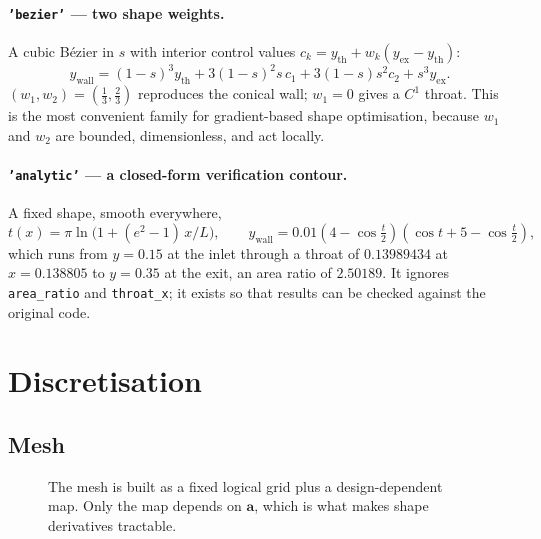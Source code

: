 \documentclass[11pt,a4paper]{article}
\newcommand{\vect}[1]{\boldsymbol{#1}}
\newcommand{\avec}{\vect{a}}
\newcommand{\code}[1]{\texttt{#1}}
\begin{document}
\paragraph{\code{'bezier'} --- two shape weights.}
A cubic B\'ezier in $s$ with interior control values
$c_k = y_{\mathrm{th}} + w_k (y_{\mathrm{ex}} - y_{\mathrm{th}})$:
\begin{equation}
  y_{\mathrm{wall}} = (1-s)^{3} y_{\mathrm{th}} + 3(1-s)^{2} s\, c_1
    + 3(1-s) s^{2} c_2 + s^{3} y_{\mathrm{ex}} .
  \label{eq:bezier}
\end{equation}
$(w_1, w_2) = (\tfrac13, \tfrac23)$ reproduces the conical wall; $w_1 = 0$ gives
a $C^1$ throat.  This is the most convenient family for gradient-based shape
optimisation, because $w_1$ and $w_2$ are bounded, dimensionless, and act
locally.

\paragraph{\code{'analytic'} --- a closed-form verification contour.}
A fixed shape, smooth everywhere,
\begin{equation}
  t(x) = \pi \ln\!\bigl(1 + (e^{2}-1)\,x/L\bigr),
  \qquad
  y_{\mathrm{wall}} = 0.01\left(4 - \cos\tfrac{t}{2}\right)
                      \left(\cos t + 5 - \cos\tfrac{t}{2}\right),
  \label{eq:analytic}
\end{equation}
which runs from $y = 0.15$ at the inlet through a throat of $0.13989434$ at
$x = 0.138805$ to $y = 0.35$ at the exit, an area ratio of $2.50189$.  It ignores
\code{area\_ratio} and \code{throat\_x}; it exists so that results can be checked
against the original code.

\section{Discretisation}

\subsection{Mesh}

\begin{figure}[H]
  \centering
  \resizebox{0.95\textwidth}{!}{}
  \caption{The mesh is built as a fixed logical grid plus a design-dependent
    map.  Only the map depends on $\avec$, which is what makes shape derivatives
    tractable.}
  \label{fig:meshmap}
\end{figure}
\end{document}
